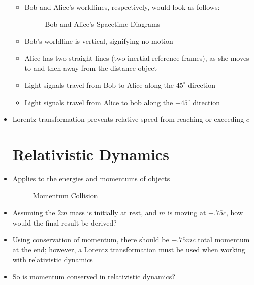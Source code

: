 \begin{itemize}
\begin{itemize}
      \item Bob and Alice's worldlines, respectively, would look as follows:

        \begin{figure}[h!]
          \centering
          
          \caption{Bob and Alice's Spacetime Diagrams}
          \label{fig:5}
        \end{figure}

      \item Bob's worldline is vertical, signifying no motion

      \item Alice has two straight lines (two inertial reference frames), as she moves to and then away from the distance object

      \item Light signals travel from Bob to Alice along the $45^{\circ}$ direction

      \item Light signals travel from Alice to bob along the $-45^{\circ}$ direction

    \end{itemize}

  \item Lorentz transformation prevents relative speed from reaching or exceeding $c$

    \section{Relativistic Dynamics}

  \item Applies to the energies and momentums of objects

    \newpage

    \begin{figure}[h!]
      \centering
      
      \caption{Momentum Collision}
      \label{fig:6}
    \end{figure}

  \item Assuming the $2m$ mass is initially at rest, and $m$ is moving at $-.75c$, how would the final result be derived?

  \item Using conservation of momentum, there should be $-.75mc$ total momentum at the end; however, a Lorentz transformation must be used when working with relativistic dynamics
    
  \item So is momentum conserved in relativistic dynamics?


\end{itemize}
